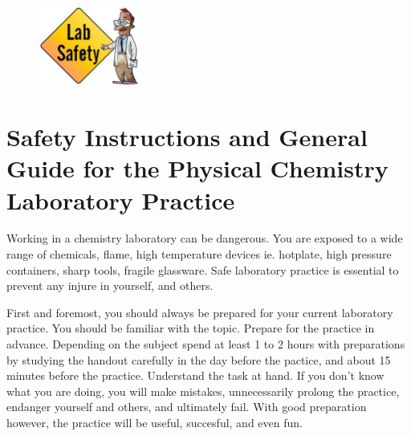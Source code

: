 \fancyhead[LO,RE]{\thesection}
\fancyfoot[LE,RO]{\thepage}

\begin{figure}
  \centering
  \includegraphics[width=0.3\textwidth]{fig/labsafety.jpg}
\end{figure}

\section*{Safety Instructions and General Guide for the Physical Chemistry Laboratory Practice}


Working in a chemistry laboratory can be dangerous. You are exposed to a wide range of chemicals, flame, high temperature devices ie. hotplate, high pressure containers, sharp tools, fragile glassware. Safe laboratory practice is essential to prevent any injure in yourself, and others.

First and foremost, you should always be prepared for your current laboratory practice. You should be familiar with the topic. Prepare for the practice in advance. Depending on the subject spend at least 1 to 2 hours with preparations by studying the handout carefully in the day before the pactice, and about 15 minutes before the practice. Understand the task at hand. If you don't know what you are doing, you will make mistakes, unnecessarily prolong the practice, endanger yourself and others, and ultimately fail. With good preparation however, the practice will be useful, succesful, and even fun.

